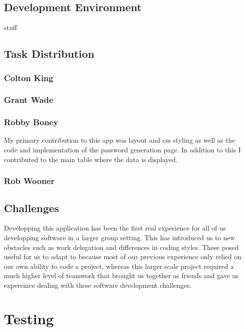 \documentclass[11pt]{report}
\begin{document}
\section{Development Environment}
stuff

\section{Task Distribution}

\subsection{Colton King}

\subsection{Grant Wade}

\subsection{Robby Boney}
My primary contribution to this app was layout and css styling as well as the 
code and implementation of the password generation page. In addition to this
I contributed to the main table where the data is displayed.

\subsection{Rob Wooner}



\section{Challenges}
Developping this application has been the first real experience for all of us
developping software in a larger group setting. This has introduced us to new
obstacles such as work delegation and differences in coding styles. These posed
useful for us to adapt to because most of our previous experience only relied
on our own ability to code a project, whereas this larger scale project 
required a much higher level of teamwork that brought us together as friends
and gave us expereince dealing with these software development challenges.




\chapter{Testing}
\end{document}
